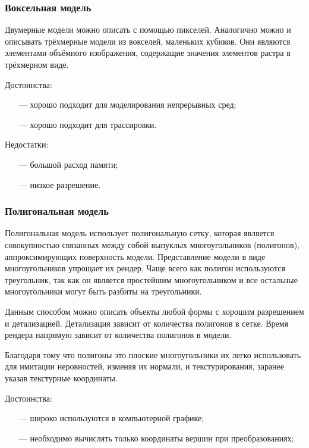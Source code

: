 \subsubsection{Воксельная модель}

Двумерные модели можно описать с помощью пикселей. Аналогично можно и описывать трёхмерные модели из вокселей, маленьких кубиков. Они являются элементами объёмного изображения, содержащие значения элементов растра в трёхмерном виде.

Достоинства:
\begin{itemize}
	\item[---] хорошо подходит для моделирования непрерывных сред;
	\item[---] хорошо подходит для трассировки.
\end{itemize}

Недостатки:
\begin{itemize}
	\item[---] большой расход памяти;
	\item[---] низкое разрешение.
\end{itemize}

\subsubsection{Полигональная модель}

Полигональная модель использует полигональную сетку, которая является совокупностью связанных между собой выпуклых многоугольников (полигонов), аппроксимирующих поверхность модели. Представление модели в виде многоугольников упрощает их рендер. Чаще всего как полигон используются треугольник, так как он является простейшим многоугольником и все остальные многоугольники могут быть разбиты на треугольники.\cite{data_view}

Данным способом можно описать объекты любой формы с хорошим разрешением и детализацией. Детализация зависит от количества полигонов в сетке. Время рендера напрямую зависит от количества полигонов в модели.

Благодаря тому что полигоны это плоские многоугольники их легко использовать для имитации неровностей, изменяя их нормали, и текстурирования, заранее указав текстурные координаты.

Достоинства:
\begin{itemize}
	\item[---] широко используются в компьютерной графике;
	\item[---] необходимо вычислять только координаты вершин при преобразованиях;
\end{itemize}

